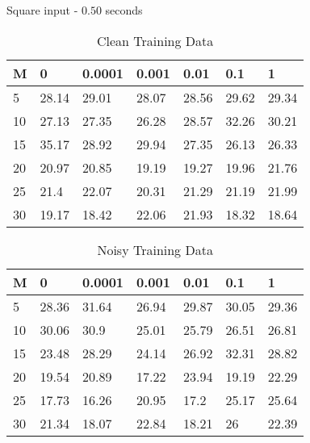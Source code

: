 \documentclass{beamer}
\begin{document}
\begin{frame}{Square input - $0.50$ seconds}
    \scriptsize
    \begin{table}[!ht]
        \centering
        \begin{tabular}{|l|l|l|l|l|l|l|}
        \hline
            M & 0 & 0.0001 & 0.001 & 0.01 & 0.1 & 1 \\ \hline
            5 & 28.14 & 29.01 & 28.07 & 28.56 & 29.62 & 29.34 \\ \hline
            10 & 27.13 & 27.35 & 26.28 & 28.57 & 32.26 & 30.21 \\ \hline
            15 & 35.17 & 28.92 & 29.94 & 27.35 & 26.13 & 26.33 \\ \hline
            20 & 20.97 & 20.85 & 19.19 & 19.27 & 19.96 & 21.76 \\ \hline
            25 & 21.4 & 22.07 & 20.31 & 21.29 & 21.19 & 21.99 \\ \hline
            30 & 19.17 & 18.42 & 22.06 & 21.93 & 18.32 & 18.64 \\ \hline
        \end{tabular}
        \caption{Clean Training Data}
    \end{table}

    \begin{table}[!ht]
        \centering
        \begin{tabular}{|l|l|l|l|l|l|l|}
        \hline
            M & 0 & 0.0001 & 0.001 & 0.01 & 0.1 & 1 \\ \hline
            5 & 28.36 & 31.64 & 26.94 & 29.87 & 30.05 & 29.36 \\ \hline
            10 & 30.06 & 30.9 & 25.01 & 25.79 & 26.51 & 26.81 \\ \hline
            15 & 23.48 & 28.29 & 24.14 & 26.92 & 32.31 & 28.82 \\ \hline
            20 & 19.54 & 20.89 & 17.22 & 23.94 & 19.19 & 22.29 \\ \hline
            25 & 17.73 & 16.26 & 20.95 & 17.2 & 25.17 & 25.64 \\ \hline
            30 & 21.34 & 18.07 & 22.84 & 18.21 & 26 & 22.39 \\ \hline
        \end{tabular}
        \caption{Noisy Training Data}
    \end{table}
\end{frame}
\end{document}
